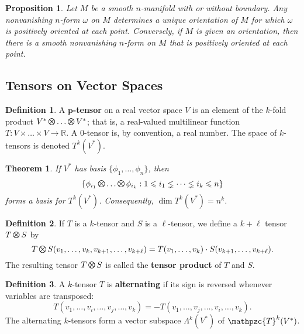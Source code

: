 \documentclass[11pt]{amsart}
\newtheorem*{theorem*}{Theorem}
\newtheorem*{proposition*}{Proposition}
\theoremstyle{definition}
\newtheorem*{definition*}{Definition}
\renewcommand\leq{\leqslant}
\renewcommand\:{\colon}
\newcommand{\R}{\mathds{R}}
\newcommand{\1}{\mathds{1}}
\DeclareMathOperator*{\motimes}{\text{\raisebox{0.25ex}{\scalebox{0.8}{$\bigotimes$}}}}
\DeclareMathOperator*{\Motimes}{\text{\raisebox{0.35ex}{\scalebox{0.6}{$\bigotimes$}}}}
\begin{document}
\begin{proposition*}
	Let $M$ be a smooth $n$-manifold with or without boundary. Any nonvanishing $n$-form $\omega$ on $M$ determines a unique orientation of $M$ for which $\omega$ is positively oriented at each point. Conversely, if $M$ is given an orientation, then there is a smooth nonvanishing $n$-form on $M$ that is positively oriented at each point.
\end{proposition*}

\vskip20pt



\subsection*{Tensors on Vector Spaces}

\begin{definition*}
	A \textbf{$\boldsymbol{p}$-tensor} on a real vector space $V$ is an element of the $k$-fold product $V^* \motimes \dots \motimes V^*$; that is, a real-valued multilinear function $T\: V \times \dots \times V \to \R$. A $0$-tensor is, by convention, a real number. The space of $k$-tensors is denoted $T^k(V^*)$.
\end{definition*}

\begin{theorem*}
	If $V^*$ has basis $\{\phi_1, \dots, \phi_n\}$, then 
		\[ \{\phi_{i_1} \Motimes \dots \Motimes \phi_{i_k} : 1 \leq i_1 \lneq \dots \lneq i_k \leq n\} \]
	forms a basis for $T^k(V^*)$. Consequently, $\dim T^k(V^*) = n^k$.
\end{theorem*}

\begin{definition*}
	If $T$ is a $k$-tensor and $S$ is a $\ell$-tensor, we define a $k + \ell$ tensor $T \motimes S$ by
		\[ T \Motimes S(v_1, \dots, v_k, v_{k + 1}, \dots, v_{k + \ell}) = T(v_1, \dots, v_k) \cdot S(v_{k + 1}, \dots, v_{k + \ell}). \]
	The resulting tensor $T \motimes S$ is called the \textbf{tensor product} of $T$ and $S$.
\end{definition*}

\begin{definition*}
	A $k$-tensor $T$ is \textbf{alternating} if its sign is reversed whenever variables are transposed:
		\[ T(v_1, \dots, v_i, \dots, v_j, \dots, v_k) = -T(v_1, \dots, v_j, \dots, v_i, \dots, v_k). \]
	The alternating $k$-tensors form a vector subspace $\Lambda^k(V^*)$ of $\mathpzc{T}^k(V^*)$.
\end{definition*}
\end{document}
